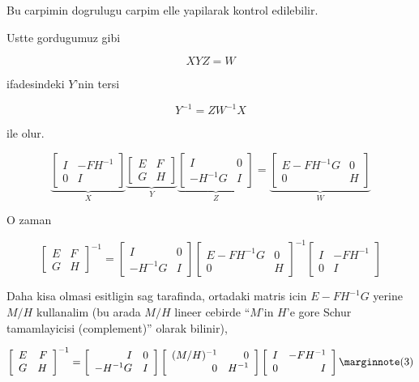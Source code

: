 \documentclass[12pt,fleqn]{article}\usepackage{../common}
\begin{document}
Bu carpimin dogrulugu carpim elle yapilarak kontrol edilebilir.

Ustte gordugumuz gibi 

\[ XYZ = W \]

ifadesindeki $Y$'nin tersi 

\[ Y^{-1} = ZW^{-1}X \]

ile olur. 

\[ 
\underbrace{
\left[\begin{array}{rr}
I & -FH^{-1} \\
0 & I
\end{array}\right] 
}_{X}
\underbrace{
\left[\begin{array}{rr}
E & F \\
G & H
\end{array}\right] 
}_{Y}
\underbrace{
\left[\begin{array}{rr}
I & 0 \\
-H^{-1}G & I
\end{array}\right] 
}_{Z}
= 
\underbrace{
\left[\begin{array}{rr}
E-FH^{-1}G & 0 \\
0 & H
\end{array}\right] 
}_{W}
 \]


O zaman 

\[ 
\left[\begin{array}{rr}
E & F \\
G & H
\end{array}\right]^{-1}
=
\left[\begin{array}{rr}
I & 0 \\
-H^{-1}G & I
\end{array}\right] 
\left[\begin{array}{rr}
E-FH^{-1}G & 0 \\
0 & H
\end{array}\right]^{-1}
\left[\begin{array}{rr}
I & -FH^{-1} \\
0 & I
\end{array}\right] 
 \]

Daha kisa olmasi esitligin sag tarafinda, ortadaki matris icin
$E-FH^{-1}G$ yerine $M/H$ kullanalim (bu arada $M/H$ lineer cebirde ``$M$'in
$H$'e gore Schur tamamlayicisi (complement)'' olarak bilinir),

\[ 
\left[\begin{array}{rr}
E & F \\
G & H
\end{array}\right]^{-1}
=
\left[\begin{array}{rr}
I & 0 \\
-H^{-1}G & I
\end{array}\right] 
\left[\begin{array}{rr}
(M/H)^{-1} & 0 \\
0 & H^{-1}
\end{array}\right]
\left[\begin{array}{rr}
I & -FH^{-1} \\
0 & I
\end{array}\right] 
\mlabel{3}
 \]
\end{document}
